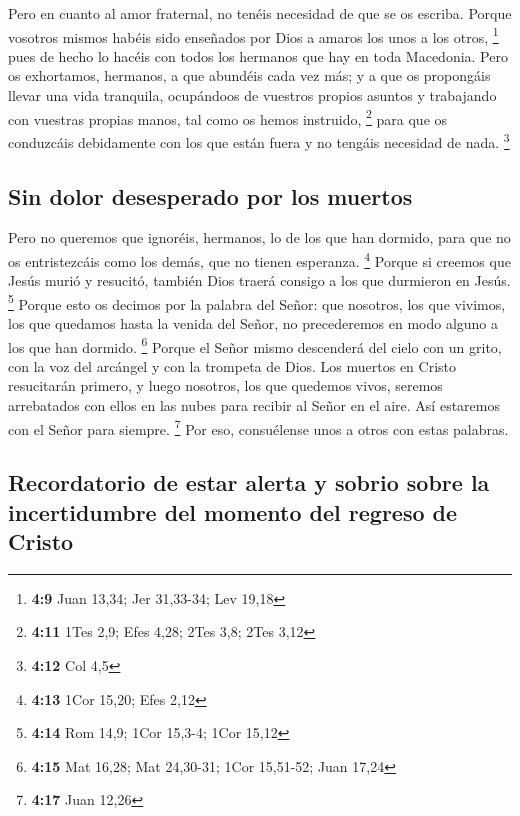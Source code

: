  Pero en cuanto al amor fraternal, no tenéis necesidad de
que se os escriba. Porque vosotros mismos habéis sido enseñados por Dios
a amaros los unos a los otros, \footnote{\textbf{4:9} Juan 13,34; Jer
  31,33-34; Lev 19,18}  pues de hecho lo hacéis con todos
los hermanos que hay en toda Macedonia. Pero os exhortamos, hermanos, a
que abundéis cada vez más;  y a que os propongáis llevar
una vida tranquila, ocupándoos de vuestros propios asuntos y trabajando
con vuestras propias manos, tal como os hemos instruido, \footnote{\textbf{4:11}
  1Tes 2,9; Efes 4,28; 2Tes 3,8; 2Tes 3,12}  para que os
conduzcáis debidamente con los que están fuera y no tengáis necesidad de
nada. \footnote{\textbf{4:12} Col 4,5}

\hypertarget{sin-dolor-desesperado-por-los-muertos}{%
\subsection{Sin dolor desesperado por los
muertos}\label{sin-dolor-desesperado-por-los-muertos}}

 Pero no queremos que ignoréis, hermanos, lo de los que
han dormido, para que no os entristezcáis como los demás, que no tienen
esperanza. \footnote{\textbf{4:13} 1Cor 15,20; Efes 2,12}
 Porque si creemos que Jesús murió y resucitó, también
Dios traerá consigo a los que durmieron en Jesús. \footnote{\textbf{4:14}
  Rom 14,9; 1Cor 15,3-4; 1Cor 15,12}  Porque esto os
decimos por la palabra del Señor: que nosotros, los que vivimos, los que
quedamos hasta la venida del Señor, no precederemos en modo alguno a los
que han dormido. \footnote{\textbf{4:15} Mat 16,28; Mat 24,30-31; 1Cor
  15,51-52; Juan 17,24}  Porque el Señor mismo descenderá
del cielo con un grito, con la voz del arcángel y con la trompeta de
Dios. Los muertos en Cristo resucitarán primero,  y luego
nosotros, los que quedemos vivos, seremos arrebatados con ellos en las
nubes para recibir al Señor en el aire. Así estaremos con el Señor para
siempre. \footnote{\textbf{4:17} Juan 12,26}  Por eso,
consuélense unos a otros con estas palabras.

\hypertarget{recordatorio-de-estar-alerta-y-sobrio-sobre-la-incertidumbre-del-momento-del-regreso-de-cristo}{%
\subsection{Recordatorio de estar alerta y sobrio sobre la incertidumbre
del momento del regreso de
Cristo}\label{recordatorio-de-estar-alerta-y-sobrio-sobre-la-incertidumbre-del-momento-del-regreso-de-cristo}}

